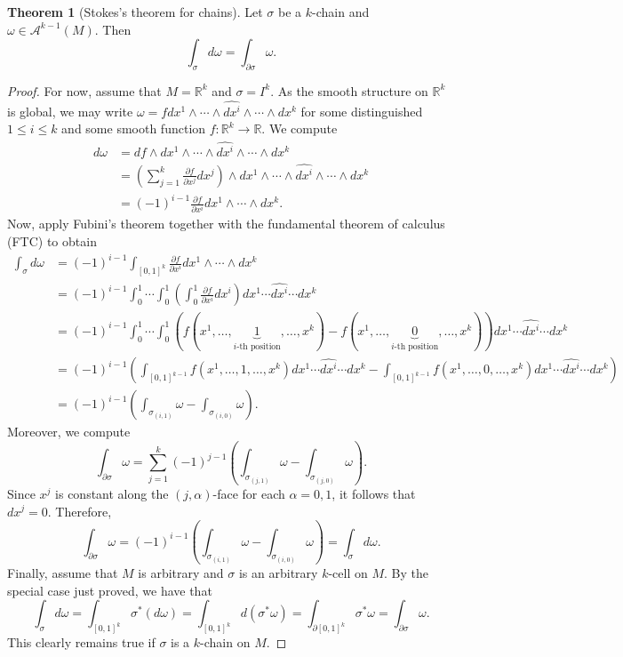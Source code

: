 \documentclass[10pt,letterpaper,cm]{nupset}
\theoremstyle{definition}
\theoremstyle{theorem}
\newtheorem{theorem}[definition]{Theorem}
\theoremstyle{remark}
\newcommand{\R}{\mathbb R}
\newcommand{\1}{\mathbf{1}}
\newcommand{\0}{\vec 0}
\begin{document}
\begin{theorem}[Stokes's theorem for chains]\label{chains}
Let $\sigma$ be a $k$-chain and $\omega \in \mathcal{A}^{k-1}(M)$. Then $$\int_{\sigma} d\omega = \int_{\partial{\sigma}} \omega.$$
\end{theorem}
\begin{proof}
For now, assume that $M= \R^k$ and $\sigma = I^k$. As the smooth structure on $\R^k$ is global, we may write $\omega = fdx^1 \wedge \cdots \wedge \widehat{dx^i} \wedge \cdots \wedge dx^k$ for some distinguished $1\leq i \leq k$ and some smooth function $f: \R^k \to \R$. We compute 
\begin{align*}
 d\omega & = df \wedge dx^1 \wedge \cdots \wedge \widehat{dx^i} \wedge \cdots \wedge dx^k
\\ & = \left(\sum_{j=1}^k\frac{\partial{f}}{\partial{x^j}}dx^j \right)\wedge dx^1 \wedge \cdots \wedge \widehat{dx^i} \wedge \cdots \wedge dx^k
\\ & = \left({-1}\right)^{i-1} \frac{\partial{f}}{\partial{x^i}}dx^1 \wedge \cdots \wedge dx^k.
\end{align*}
Now, apply Fubini's theorem  together with the fundamental theorem of calculus (FTC) to obtain
\begin{align*}
 \int_{\sigma}d\omega & = \left({-1}\right)^{i-1}\int_{\left[0,1\right]^k} \frac{\partial{f}}{\partial{x^i}}dx^1 \wedge \cdots \wedge dx^k
\\ & = \left({-1}\right)^{i-1}\int_0^1 \cdots \int_0^1 \left(\int_0^1  \frac{\partial{f}}{\partial{x^i}}dx^i \right)dx^1 \cdots \widehat{dx^i}  \cdots dx^k
\\ & = \left({-1}\right)^{i-1}\int_0^1 \cdots \int_0^1(f(x^1, \ldots, \underbrace{1}_{i\text{-th position}}, \ldots, x^k) - f(x^1, \ldots, \underbrace{0}_{i\text{-th position}}, \ldots, x^k))dx^1 \cdots \widehat{dx^i}  \cdots dx^k
\\ & =  \left({-1}\right)^{i-1}\left( \int_{\left[0,1\right]^{k-1}} f(x^1, \ldots, 1, \ldots, x^k)dx^1 \cdots \widehat{dx^i}  \cdots dx^k -\int_{\left[0,1\right]^{k-1}}f(x^1, \ldots, 0, \ldots, x^k)dx^1 \cdots \widehat{dx^i}  \cdots dx^k \right)
\\ & = \left({-1}\right)^{i-1}\left(\int_{\sigma_{(i, 1)}}\omega - \int_{\sigma_{(i, 0)}}\omega \right) .
\end{align*}
Moreover, we compute
$$ \int_{\partial{\sigma}}\omega = \sum_{j=1}^k\left({-1}\right)^{j-1}\left(\int_{\sigma_{(j, 1)}}\omega - \int_{\sigma_{(j, 0)}}\omega \right).$$
Since $x^j$ is constant along the $\left(j, \alpha\right)$-face for each $\alpha = 0, 1$, it follows that $dx^j = 0$. Therefore, $$ \int_{\partial{\sigma}}\omega =   \left({-1}\right)^{i-1}\left(\int_{\sigma_{(i, 1)}}\omega - \int_{\sigma_{(i, 0)}}\omega \right) = \int_{\sigma} d\omega.$$
Finally, assume that $M$ is arbitrary and $\sigma $ is an arbitrary $k$-cell on $M$. By the special case just proved, we have that
$$  \int_{\sigma}d\omega = \int_{\left[0,1\right]^k}\sigma^{\ast}(d\omega) = \int_{\left[0,1\right]^k}d(\sigma^{\ast}\omega) = \int_{\partial{\left[0,1\right]^k}}\sigma^{\ast} \omega = \int_{\partial{\sigma}} \omega .$$
This clearly remains true if $\sigma$ is a $k$-chain on $M$.
\end{proof}
\end{document}
